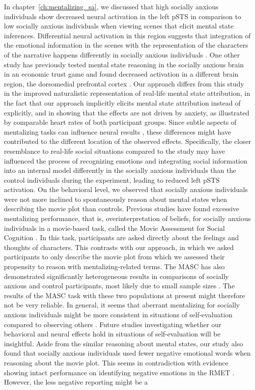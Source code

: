 In chapter~\ref{ch:mentalizing_sa}, we discussed that high socially anxious individuals show decreased neural activation in the left pSTS in comparison to low socially anxious individuals when viewing scenes that elicit mental state inferences. Differential neural activation in this region suggests that integration of the emotional information in the scenes with the representation of the characters of the narrative happens differently in socially anxious individuals \citep{patel2019,davey2016}. One other study has previously tested mental state reasoning in the socially anxious brain in an economic trust game and found decreased activation in a different brain region, the dorsomedial prefrontal cortex \citep[dmPFC; ][]{sripada2009}. Our approach differs from this study in the improved naturalistic representation of real-life mental state attribution, in the fact that our approach implicitly elicits mental state attribution instead of explicitly, and in showing that the effects are not driven by anxiety, as illustrated by comparable heart rates of both participant groups. Since subtle aspects of mentalizing tasks can influence neural results \citep{schurz2014}, these differences might have contributed to the different location of the observed effects. Specifically, the closer resemblance to real-life social situations compared to the \cite{sripada2009} study may have influenced the process of recognizing emotions and integrating social information into an internal model differently in the socially anxious individuals than the control individuals during the experiment, leading to reduced left pSTS activation. On the behavioral level, we observed that socially anxious individuals were not more inclined to spontaneously reason about mental states when describing the movie plot than controls. Previous studies have found excessive mentalizing performance, that is, overinterpretation of beliefs, for socially anxious individuals in a movie-based task, called the Movie Assessment for Social Cognition \citep[MASC; ][]{hezel2014,washburn2016,dziobek2006}. In this task, participants are asked directly about the feelings and thoughts of characters. This contrasts with our approach, in which we asked participants to only describe the movie plot from which we assessed their propensity to reason with mentalizing-related terms. The MASC has also demonstrated significantly heterogeneous results in comparisons of socially anxious and control participants, most likely due to small sample sizes \citep{baez2023}. The results of the MASC task with these two populations at present might therefore not be very reliable. In general, it seems that aberrant mentalizing for socially anxious individuals might be more consistent in situations of self-evaluation compared to observing others \citep{ballespi2019}. Future studies investigating whether our behavioral and neural effects hold in situations of self-evaluation will be insightful. Aside from the similar reasoning about mental states, our study also found that socially anxious individuals used fewer negative emotional words when reasoning about the movie plot. This seems in contradiction with evidence showing intact performance on identifying negative emotions in the RMET \citep{washburn2016}. However, the less negative reporting might be a 